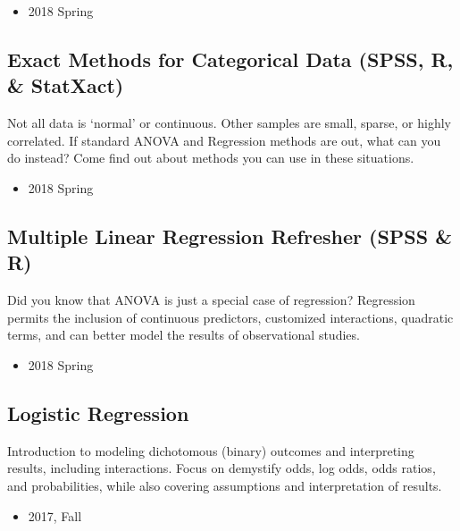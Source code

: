 \documentclass[11pt,a4paper,]{moderncv}
\providecommand{\tightlist}{%
	\setlength{\itemsep}{0pt}\setlength{\parskip}{0pt}}
\begin{document}
\begin{itemize}
\tightlist
\item
  2018 Spring
\end{itemize}

\hypertarget{exact-methods-for-categorical-data-spss-r-statxact}{%
\subsection{Exact Methods for Categorical Data (SPSS, R, \&
StatXact)}\label{exact-methods-for-categorical-data-spss-r-statxact}}

Not all data is `normal' or continuous. Other samples are small, sparse,
or highly correlated. If standard ANOVA and Regression methods are out,
what can you do instead? Come find out about methods you can use in
these situations.

\begin{itemize}
\tightlist
\item
  2018 Spring
\end{itemize}

\hypertarget{multiple-linear-regression-refresher-spss-r}{%
\subsection{Multiple Linear Regression Refresher (SPSS \&
R)}\label{multiple-linear-regression-refresher-spss-r}}

Did you know that ANOVA is just a special case of regression? Regression
permits the inclusion of continuous predictors, customized interactions,
quadratic terms, and can better model the results of observational
studies.

\begin{itemize}
\tightlist
\item
  2018 Spring
\end{itemize}

\hypertarget{logistic-regression}{%
\subsection{Logistic Regression}\label{logistic-regression}}

Introduction to modeling dichotomous (binary) outcomes and interpreting
results, including interactions. Focus on demystify odds, log odds, odds
ratios, and probabilities, while also covering assumptions and
interpretation of results.

\begin{itemize}
\tightlist
\item
  2017, Fall
\end{itemize}
\end{document}
